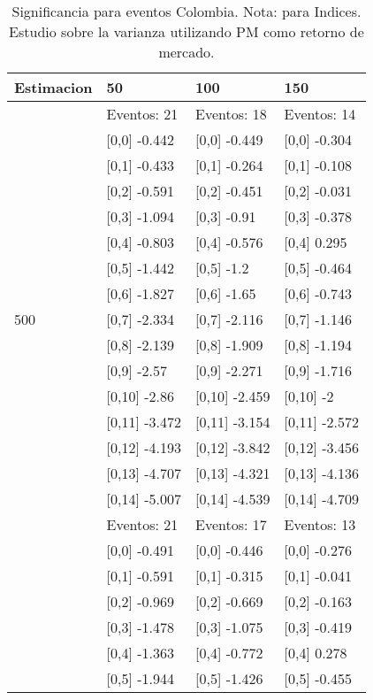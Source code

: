 \begin{table}

\caption{Significancia para eventos Colombia. Nota: para Indices. Estudio sobre la varianza utilizando PM como retorno de mercado.}
\centering
\begin{tabular}[t]{llll}
\toprule
Estimacion & 50 & 100 & 150\\
\midrule
 & Eventos:  21 & Eventos:  18 & Eventos:  14\\
 & {}[0,0] -0.442 & {}[0,0] -0.449 & {}[0,0] -0.304\\
 & {}[0,1] -0.433 & {}[0,1] -0.264 & {}[0,1] -0.108\\
 & {}[0,2] -0.591 & {}[0,2] -0.451 & {}[0,2] -0.031\\
 & {}[0,3] -1.094 & {}[0,3] -0.91 & {}[0,3] -0.378\\
\addlinespace
 & {}[0,4] -0.803 & {}[0,4] -0.576 & {}[0,4] 0.295\\
 & {}[0,5] -1.442 & {}[0,5] -1.2 & {}[0,5] -0.464\\
 & {}[0,6] -1.827 & {}[0,6] -1.65 & {}[0,6] -0.743\\
500 & {}[0,7] -2.334 & {}[0,7] -2.116 & {}[0,7] -1.146\\
 & {}[0,8] -2.139 & {}[0,8] -1.909 & {}[0,8] -1.194\\
\addlinespace
 & {}[0,9] -2.57 & {}[0,9] -2.271 & {}[0,9] -1.716\\
 & {}[0,10] -2.86 & {}[0,10] -2.459 & {}[0,10] -2\\
 & {}[0,11] -3.472 & {}[0,11] -3.154 & {}[0,11] -2.572\\
 & {}[0,12] -4.193 & {}[0,12] -3.842 & {}[0,12] -3.456\\
 & {}[0,13] -4.707 & {}[0,13] -4.321 & {}[0,13] -4.136\\
\addlinespace
 & {}[0,14] -5.007 & {}[0,14] -4.539 & {}[0,14] -4.709\\
 & Eventos:  21 & Eventos:  17 & Eventos:  13\\
 & {}[0,0] -0.491 & {}[0,0] -0.446 & {}[0,0] -0.276\\
 & {}[0,1] -0.591 & {}[0,1] -0.315 & {}[0,1] -0.041\\
 & {}[0,2] -0.969 & {}[0,2] -0.669 & {}[0,2] -0.163\\
\addlinespace
 & {}[0,3] -1.478 & {}[0,3] -1.075 & {}[0,3] -0.419\\
 & {}[0,4] -1.363 & {}[0,4] -0.772 & {}[0,4] 0.278\\
 & {}[0,5] -1.944 & {}[0,5] -1.426 & {}[0,5] -0.455\\

\end{tabular}
\end{table}
